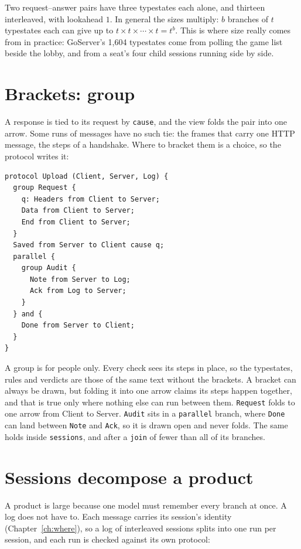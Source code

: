 Two request--answer pairs have three typestates each alone, and thirteen interleaved, with
lookahead $1$. In general the sizes multiply: $b$ branches of $t$ typestates each can give
up to $t \times t \times \cdots \times t = t^b$. This is where size really comes from in
practice: GoServer's 1{,}604 typestates come from polling the game list beside the lobby,
and from a seat's four child sessions running side by side.

\section{Brackets: group}

A response is tied to its request by \texttt{cause}, and the view folds the pair into one
arrow. Some runs of messages have no such tie: the frames that carry one HTTP message, the
steps of a handshake. Where to bracket them is a choice, so the protocol writes it:
\begin{lstlisting}[language={},basicstyle=\ttfamily\footnotesize]
protocol Upload (Client, Server, Log) {
  group Request {
    q: Headers from Client to Server;
    Data from Client to Server;
    End from Client to Server;
  }
  Saved from Server to Client cause q;
  parallel {
    group Audit {
      Note from Server to Log;
      Ack from Log to Server;
    }
  } and {
    Done from Server to Client;
  }
}
\end{lstlisting}
A group is for people only. Every check sees its steps in place, so the typestates, rules
and verdicts are those of the same text without the brackets. A bracket can always be
drawn, but folding it into one arrow claims its steps happen together, and that is true
only where nothing else can run between them. \texttt{Request} folds to one arrow from
Client to Server. \texttt{Audit} sits in a \texttt{parallel} branch, where \texttt{Done}
can land between \texttt{Note} and \texttt{Ack}, so it is drawn open and never folds. The
same holds inside \texttt{sessions}, and after a \texttt{join} of fewer than all of its
branches.

\section{Sessions decompose a product}\label{prop:sessions}

A product is large because one model must remember every branch at once. A log does not
have to. Each message carries its session's identity (Chapter~\ref{ch:where}), so a log of
interleaved sessions splits into one run per session, and each run is checked against its
own protocol:

